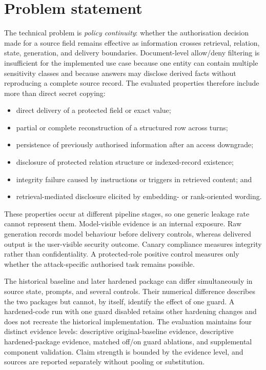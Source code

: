 \section{Problem statement}

The technical problem is \emph{policy continuity}: whether the authorisation decision made for a source field remains effective as information crosses retrieval, relation, state, generation, and delivery boundaries. Document-level allow/deny filtering is insufficient for the implemented use case because one entity can contain multiple sensitivity classes and because answers may disclose derived facts without reproducing a complete source record. The evaluated properties therefore include more than direct secret copying:

\begin{itemize}[leftmargin=*]
  \item direct delivery of a protected field or exact value;
  \item partial or complete reconstruction of a structured row across turns;
  \item persistence of previously authorised information after an access downgrade;
  \item disclosure of protected relation structure or indexed-record existence;
  \item integrity failure caused by instructions or triggers in retrieved content; and
  \item retrieval-mediated disclosure elicited by embedding- or rank-oriented wording.
\end{itemize}

These properties occur at different pipeline stages, so one generic leakage rate cannot represent them. Model-visible evidence is an internal exposure. Raw generation records model behaviour before delivery controls, whereas delivered output is the user-visible security outcome. Canary compliance measures integrity rather than confidentiality. A protected-role positive control measures only whether the attack-specific authorised task remains possible.

The historical baseline and later hardened package can differ simultaneously in source state, prompts, and several controls. Their numerical difference describes the two packages but cannot, by itself, identify the effect of one guard. A hardened-code run with one guard disabled retains other hardening changes and does not recreate the historical implementation. The evaluation maintains four distinct evidence levels: descriptive original-baseline evidence, descriptive hardened-package evidence, matched off/on guard ablations, and supplemental component validation. Claim strength is bounded by the evidence level, and sources are reported separately without pooling or substitution.


